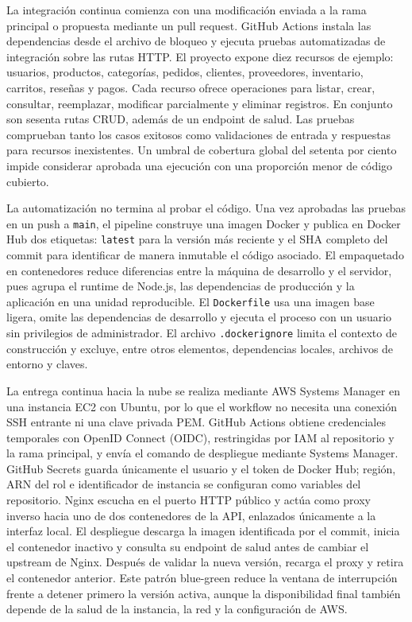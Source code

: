 \documentclass[12pt,letterpaper]{article}
\begin{document}
La integración continua comienza con una modificación enviada a la rama principal o propuesta mediante un pull request. GitHub Actions instala las dependencias desde el archivo de bloqueo y ejecuta pruebas automatizadas de integración sobre las rutas HTTP. El proyecto expone diez recursos de ejemplo: usuarios, productos, categorías, pedidos, clientes, proveedores, inventario, carritos, reseñas y pagos. Cada recurso ofrece operaciones para listar, crear, consultar, reemplazar, modificar parcialmente y eliminar registros. En conjunto son sesenta rutas CRUD, además de un endpoint de salud. Las pruebas comprueban tanto los casos exitosos como validaciones de entrada y respuestas para recursos inexistentes. Un umbral de cobertura global del setenta por ciento impide considerar aprobada una ejecución con una proporción menor de código cubierto.

La automatización no termina al probar el código. Una vez aprobadas las pruebas en un push a \texttt{main}, el pipeline construye una imagen Docker y publica en Docker Hub dos etiquetas: \texttt{latest} para la versión más reciente y el SHA completo del commit para identificar de manera inmutable el código asociado. El empaquetado en contenedores reduce diferencias entre la máquina de desarrollo y el servidor, pues agrupa el runtime de Node.js, las dependencias de producción y la aplicación en una unidad reproducible. El \texttt{Dockerfile} usa una imagen base ligera, omite las dependencias de desarrollo y ejecuta el proceso con un usuario sin privilegios de administrador. El archivo \texttt{.dockerignore} limita el contexto de construcción y excluye, entre otros elementos, dependencias locales, archivos de entorno y claves.

La entrega continua hacia la nube se realiza mediante AWS Systems Manager en una instancia EC2 con Ubuntu, por lo que el workflow no necesita una conexión SSH entrante ni una clave privada PEM. GitHub Actions obtiene credenciales temporales con OpenID Connect (OIDC), restringidas por IAM al repositorio y la rama principal, y envía el comando de despliegue mediante Systems Manager. GitHub Secrets guarda únicamente el usuario y el token de Docker Hub; región, ARN del rol e identificador de instancia se configuran como variables del repositorio. Nginx escucha en el puerto HTTP público y actúa como proxy inverso hacia uno de dos contenedores de la API, enlazados únicamente a la interfaz local. El despliegue descarga la imagen identificada por el commit, inicia el contenedor inactivo y consulta su endpoint de salud antes de cambiar el upstream de Nginx. Después de validar la nueva versión, recarga el proxy y retira el contenedor anterior. Este patrón blue-green reduce la ventana de interrupción frente a detener primero la versión activa, aunque la disponibilidad final también depende de la salud de la instancia, la red y la configuración de AWS.
\end{document}
